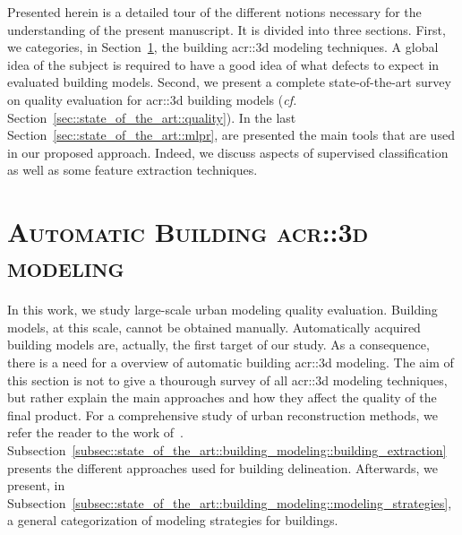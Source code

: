 \minitoc

\vfill

Presented herein is a detailed tour of the different notions necessary for the understanding of the present manuscript.
It is divided into three sections.
First, we categories, in Section~\ref{sec::state_of_the_art::building_modeling}, the building \gls{acr::3d} modeling techniques.
A global idea of the subject is required to have a good idea of what defects to expect in evaluated building models.
Second, we present a complete state-of-the-art survey on quality evaluation for \gls{acr::3d} building models (\textit{cf.} Section~\ref{sec::state_of_the_art::quality}).
In the last Section~\ref{sec::state_of_the_art::mlpr}, are presented the main tools that are used in our proposed approach.
Indeed, we discuss aspects of supervised classification as well as some feature extraction techniques.

\clearpage

\section{\textsc{Automatic Building \texorpdfstring{\gls*{acr::3d}}{3D} modeling}}
    \label{sec::state_of_the_art::building_modeling}
    In this work, we study large-scale urban modeling quality evaluation.
    Building models, at this scale, cannot be obtained manually.
    Automatically acquired building models are, actually, the first target of our study.
    As a consequence, there is a need for a overview of automatic building \gls{acr::3d} modeling.
    The aim of this section is not to give a thourough survey of all \gls{acr::3d} modeling techniques, but rather explain the main approaches and how they affect the quality of the final product.
    For a comprehensive study of urban reconstruction methods, we refer the reader to the work of~\textcite{musialski2013survey}.\\
    Subsection~\ref{subsec::state_of_the_art::building_modeling::building_extraction} presents the different approaches used for building delineation.
    Afterwards, we present, in Subsection~\ref{subsec::state_of_the_art::building_modeling::modeling_strategies}, a general categorization of modeling strategies for buildings.

